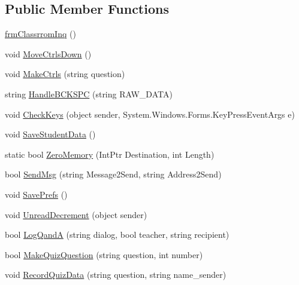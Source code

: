 \subsection*{\-Public \-Member \-Functions}
\begin{DoxyCompactItemize}
\item 
\hyperlink{class_sr_p___classroom_inq_1_1frm_classrrom_inq_ad4c66414acc8ac456211b3f8024ed68c}{frm\-Classrrom\-Inq} ()
\item 
void \hyperlink{class_sr_p___classroom_inq_1_1frm_classrrom_inq_aa37996d682b5f7d39e5e53d8edd658ab}{\-Move\-Ctrls\-Down} ()
\item 
void \hyperlink{class_sr_p___classroom_inq_1_1frm_classrrom_inq_a8ae3b3804b16d4c67b8ff652eb5488ed}{\-Make\-Ctrls} (string question)
\item 
string \hyperlink{class_sr_p___classroom_inq_1_1frm_classrrom_inq_aecc5d7b6ce2373bb863ce0eefa481783}{\-Handle\-B\-C\-K\-S\-P\-C} (string \-R\-A\-W\-\_\-\-D\-A\-T\-A)
\item 
void \hyperlink{class_sr_p___classroom_inq_1_1frm_classrrom_inq_a5703a99c40db13bca956c2204fbb1205}{\-Check\-Keys} (object sender, \-System.\-Windows.\-Forms.\-Key\-Press\-Event\-Args e)
\item 
void \hyperlink{class_sr_p___classroom_inq_1_1frm_classrrom_inq_a592fd224417dbd9b7031128315cf0f45}{\-Save\-Student\-Data} ()
\item 
static bool \hyperlink{class_sr_p___classroom_inq_1_1frm_classrrom_inq_a9e1b1e677182d3bb85b5f2bbc80d60fb}{\-Zero\-Memory} (\-Int\-Ptr \-Destination, int \-Length)
\item 
bool \hyperlink{class_sr_p___classroom_inq_1_1frm_classrrom_inq_a525504ef91d8a99202dbcbc825a7aac2}{\-Send\-Msg} (string \-Message2\-Send, string \-Address2\-Send)
\item 
void \hyperlink{class_sr_p___classroom_inq_1_1frm_classrrom_inq_aabba19a4aa4afa3cfe15cace40e76130}{\-Save\-Prefs} ()
\item 
void \hyperlink{class_sr_p___classroom_inq_1_1frm_classrrom_inq_ad0d8d87caafd97e9a48736804a88587c}{\-Unread\-Decrement} (object sender)
\item 
bool \hyperlink{class_sr_p___classroom_inq_1_1frm_classrrom_inq_a3013595b3a4e7bb6d8c8871d788aad44}{\-Log\-Qand\-A} (string dialog, bool teacher, string recipient)
\item 
bool \hyperlink{class_sr_p___classroom_inq_1_1frm_classrrom_inq_af53e6dc60cbe667e6b83a7591ee7678f}{\-Make\-Quiz\-Question} (string question, int number)
\item 
void \hyperlink{class_sr_p___classroom_inq_1_1frm_classrrom_inq_a3571b56a7d0a64193e695447f01f6aa3}{\-Record\-Quiz\-Data} (string question, string name\-\_\-sender)
\end{DoxyCompactItemize}
